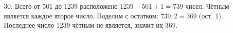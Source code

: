 30. Всего от 501 до 1239 расположено $1239-501+1=739$ чисел. Чётным является каждое второе число. Поделим с остатком: $739:2=369$ (ост. 1). Последнее число 1239 чётным не является, значит их 369.\\
